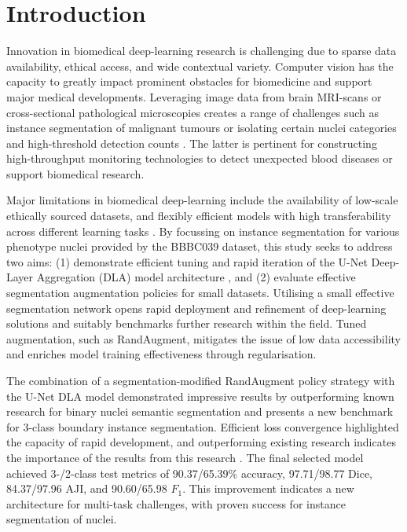 \section{Introduction}
\label{sec:introduction}

Innovation in biomedical deep-learning research is challenging due to sparse data availability, ethical access, and wide contextual variety. Computer vision has the capacity to greatly impact prominent obstacles for biomedicine and support major medical developments. Leveraging image data from brain MRI-scans or cross-sectional pathological microscopies creates a range of challenges such as instance segmentation of malignant tumours or isolating certain nuclei categories and high-threshold detection counts \cite{BBBC039Dataset}. The latter is pertinent for constructing high-throughput monitoring technologies to detect unexpected blood diseases or support biomedical research.

Major limitations in biomedical deep-learning include the availability of low-scale ethically sourced datasets, and flexibly efficient models with high transferability across different learning tasks \cite{BBBC039Dataset,BBBC039ResearchStudy}. By focussing on instance segmentation for various phenotype nuclei provided by the BBBC039 dataset, this study seeks to address two aims: (1) demonstrate efficient tuning and rapid iteration of the U-Net Deep-Layer Aggregation (DLA) model architecture \cite{UNet,DLA}, and (2) evaluate effective segmentation augmentation policies for small datasets. Utilising a small effective segmentation network opens rapid deployment and refinement of deep-learning solutions and suitably benchmarks further research within the field. Tuned augmentation, such as RandAugment, mitigates the issue of low data accessibility and enriches model training effectiveness through regularisation.

The combination of a segmentation-modified RandAugment policy strategy with the U-Net DLA model demonstrated impressive results by outperforming known research for binary nuclei semantic segmentation and presents a new benchmark for 3-class boundary instance segmentation. Efficient loss convergence highlighted the capacity of rapid development, and outperforming existing research indicates the importance of the results from this research \cite{BBBC039ResearchStudy}. The final selected model achieved 3-/2-class test metrics of 90.37/65.39\% accuracy, 97.71/98.77 Dice, 84.37/97.96 AJI, and 90.60/65.98 $F_1$. This improvement indicates a new architecture for multi-task challenges, with proven success for instance segmentation of nuclei.
